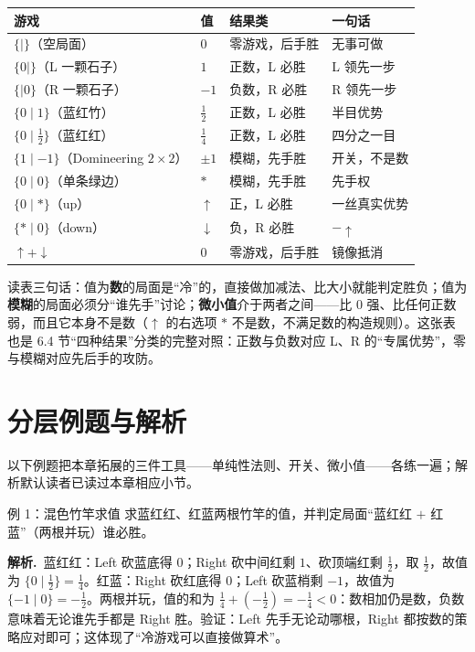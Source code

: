 \documentclass[UTF8,a4paper,11pt,oneside,openany,fontset=fandol]{ctexbook}
\theoremstyle{definition}
\newcommand{\sol}{\par\noindent\textbf{解析.}\ }
\begin{document}
\begin{center}
\begin{tabular}{llll}
\toprule
游戏 & 值 & 结果类 & 一句话\\
\midrule
$\{\mid\}$（空局面） & $0$ & 零游戏，后手胜 & 无事可做\\
$\{0\mid\}$（L 一颗石子） & $1$ & 正数，L 必胜 & L 领先一步\\
$\{\mid 0\}$（R 一颗石子） & $-1$ & 负数，R 必胜 & R 领先一步\\
$\{0\mid 1\}$（蓝红竹） & $\tfrac12$ & 正数，L 必胜 & 半目优势\\
$\{0\mid \tfrac12\}$（蓝红红） & $\tfrac14$ & 正数，L 必胜 & 四分之一目\\
$\{1\mid -1\}$（Domineering $2\times2$） & $\pm1$ & 模糊，先手胜 & 开关，不是数\\
$\{0\mid 0\}$（单条绿边） & $\ast$ & 模糊，先手胜 & 先手权\\
$\{0\mid \ast\}$（up） & $\uparrow$ & 正，L 必胜 & 一丝真实优势\\
$\{\ast\mid 0\}$（down） & $\downarrow$ & 负，R 必胜 & $-\uparrow$\\
$\uparrow+\downarrow$ & $0$ & 零游戏，后手胜 & 镜像抵消\\
\bottomrule
\end{tabular}
\end{center}

读表三句话：值为\textbf{数}的局面是“冷”的，直接做加减法、比大小就能判定胜负；值为\textbf{模糊}的局面必须分“谁先手”讨论；\textbf{微小值}介于两者之间——比 $0$ 强、比任何正数弱，而且它本身不是数（$\uparrow$ 的右选项 $\ast$ 不是数，不满足数的构造规则）。这张表也是 6.4 节“四种结果”分类的完整对照：正数与负数对应 L、R 的“专属优势”，零与模糊对应先后手的攻防。

\section{分层例题与解析}
以下例题把本章拓展的三件工具——单纯性法则、开关、微小值——各练一遍；解析默认读者已读过本章相应小节。

\begin{problem}{例 1：混色竹竿求值}
求蓝红红、红蓝两根竹竿的值，并判定局面“蓝红红 $+$ 红蓝”（两根并玩）谁必胜。
\end{problem}

\sol 蓝红红：Left 砍蓝底得 $0$；Right 砍中间红剩 $1$、砍顶端红剩 $\tfrac12$，取 $\tfrac12$，故值为 $\{0\mid\tfrac12\}=\tfrac14$。红蓝：Right 砍红底得 $0$；Left 砍蓝梢剩 $-1$，故值为 $\{-1\mid 0\}=-\tfrac12$。两根并玩，值的和为 $\tfrac14+(-\tfrac12)=-\tfrac14<0$：数相加仍是数，负数意味着无论谁先手都是 Right 胜。验证：Left 先手无论动哪根，Right 都按数的策略应对即可；这体现了“冷游戏可以直接做算术”。
\end{document}
